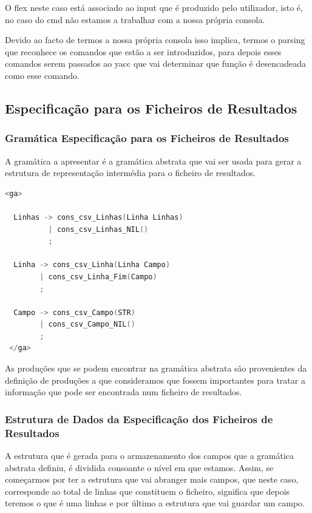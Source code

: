 \documentclass[11pt, a4paper, oneside]{article}
\begin{document}
O \textsf{flex} neste caso está associado ao input que é produzido pelo utilizador, isto é, no caso do cmd não estamos a trabalhar com a nossa própria consola.

Devido ao facto de termos a nossa própria consola isso implica, termos o parsing que reconhece os comandos que estão a ser introduzidos, para depois esses comandos serem passados ao \textsf{yacc} que vai determinar que função é desencadeada como esse comando.

\subsection{Especificação para os Ficheiros de Resultados}

\subsubsection{Gramática Especificação para os Ficheiros de Resultados}

A gramática a apresentar é a gramática abstrata que vai ser usada para gerar a estrutura de representação intermédia para o ficheiro de resultados.

\begin{lstlisting}[language=C, caption={Gramática para a linguagem de especificação para os ficheiros de resultados.}]
<ga>
  
  Linhas -> cons_csv_Linhas(Linha Linhas)
          | cons_csv_Linhas_NIL()
          ;

  Linha -> cons_csv_Linha(Linha Campo)
        | cons_csv_Linha_Fim(Campo)
        ;

  Campo -> cons_csv_Campo(STR)
        | cons_csv_Campo_NIL()
        ;
 </ga>
\end{lstlisting}

As produções que se podem encontrar na gramática abstrata são provenientes da definição de produções a que consideramos que fossem importantes para tratar a informação que pode ser encontrada num ficheiro de resultados.

\subsubsection{Estrutura de Dados da Especificação dos Ficheiros de Resultados}

A estrutura que é gerada para o armazenamento dos campos que a gramática abstrata definiu, é dividida consoante o nível em que estamos. Assim, se começarmos por ter a estrutura que vai abranger mais campos, que neste caso, corresponde ao total de linhas que constituem o ficheiro, significa que depois teremos o que é uma linhas e por último a estrutura que vai guardar um campo.
\end{document}
